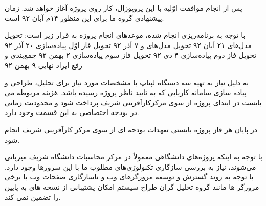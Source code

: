 پس از انجام موافقت اوّلیه با این پروپوزال، کار روی پروژه آغاز خواهد شد. زمان پیشنهادی گروه ما برای این منظور ۱۴م آبان ۹۲ است.

با توجه به برنامه‌ریزی انجام شده، موعدهای انجام پروژه به قرار زیر است:
 تحویل مدل‌های  \hfill ۲۱ آبان ۹۲
 تحویل مدل‌های  و  \hfill ۷ آذر ۹۲
 تحویل فاز اوّل پیاده‌سازی  \hfill ۲۰ آذر ۹۲
 تحویل فاز دوم پیاده‌سازی  \hfill ۴ دی ۹۲
 تحویل فاز سوم پیاده‌سازی  \hfill ۲ بهمن ۹۲
 جمع‌بندی و رفع ایراد نهایی  \hfill ۹ بهمن ۹۲ 

به دلیل نیاز به تهیه سه دستگاه لپتاپ با مشخصات مورد نیاز برای تحلیل، طراحی و پیاده سازی سامانه کاریابی که به تایید ناظر پروژه رسیده باشد. هزینه مربوطه می بایست در ابتدای پروژه از سوی مرکزکارآفرینی شریف پرداخت شود و محدودیت زمانی در بودجه اختصاصی به این قسمت وجود دارد.

 در پایان هر فاز پروژه بایستی تعهدات بودجه ای از سوی مرکز کارآفرینی شریف انجام شود.


 با توجه به اینکه پروژه‌های دانشگاهی معمولاً در مرکز محاسبات دانشگاه شریف میزبانی می‌شوند، نیاز به بررسی سازگاری تکنولوژی‌های مطلوب ما با این سرورها وجود دارد.
 با توجه به روند گسترش و توسعه مرورگرهای وب و ناسازگاری صفحات وب با برخی مرورگر ها مانند  گروه تحلیل گران طراح سیستم امکان پشتیبانی از نسخه های  به پایین را تضمین نمی کند.
